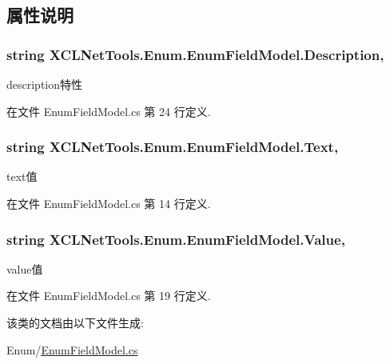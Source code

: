 \subsection{属性说明}
\hypertarget{class_x_c_l_net_tools_1_1_enum_1_1_enum_field_model_a182875468bc25ee9c6adb98582e3683e}{
\subsubsection[{Description}]{\setlength{\rightskip}{0pt plus 5cm}string X\-C\-L\-Net\-Tools.\-Enum.\-Enum\-Field\-Model.\-Description\hspace{0.3cm}{\ttfamily [get]}, {\ttfamily [set]}}}\label{class_x_c_l_net_tools_1_1_enum_1_1_enum_field_model_a182875468bc25ee9c6adb98582e3683e}


description特性 



在文件 Enum\-Field\-Model.\-cs 第 24 行定义.

\hypertarget{class_x_c_l_net_tools_1_1_enum_1_1_enum_field_model_acbbc7df1972c0c70dfcf43413da878a8}{
\subsubsection[{Text}]{\setlength{\rightskip}{0pt plus 5cm}string X\-C\-L\-Net\-Tools.\-Enum.\-Enum\-Field\-Model.\-Text\hspace{0.3cm}{\ttfamily [get]}, {\ttfamily [set]}}}\label{class_x_c_l_net_tools_1_1_enum_1_1_enum_field_model_acbbc7df1972c0c70dfcf43413da878a8}


text值 



在文件 Enum\-Field\-Model.\-cs 第 14 行定义.

\hypertarget{class_x_c_l_net_tools_1_1_enum_1_1_enum_field_model_a907462fed405f7065a6fc013cc919e29}{
\subsubsection[{Value}]{\setlength{\rightskip}{0pt plus 5cm}string X\-C\-L\-Net\-Tools.\-Enum.\-Enum\-Field\-Model.\-Value\hspace{0.3cm}{\ttfamily [get]}, {\ttfamily [set]}}}\label{class_x_c_l_net_tools_1_1_enum_1_1_enum_field_model_a907462fed405f7065a6fc013cc919e29}


value值 



在文件 Enum\-Field\-Model.\-cs 第 19 行定义.



该类的文档由以下文件生成\-:\begin{DoxyCompactItemize}
\item 
Enum/\hyperlink{_enum_field_model_8cs}{Enum\-Field\-Model.\-cs}\end{DoxyCompactItemize}
